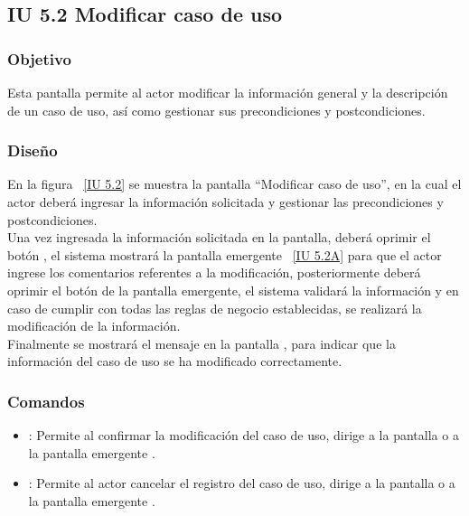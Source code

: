 \newpage 
\subsection{IU 5.2 Modificar caso de uso}

\subsubsection{Objetivo}
	
	Esta pantalla permite al actor modificar la información general y la descripción de un caso de uso, así como gestionar sus precondiciones y postcondiciones.

\subsubsection{Diseño}

    En la figura ~\ref{IU 5.2} se muestra la pantalla ``Modificar caso de uso'', en la cual el actor deberá ingresar la información solicitada y gestionar las precondiciones y postcondiciones.\\
    
    Una vez ingresada la información solicitada en la pantalla, deberá oprimir el botón , el sistema mostrará la pantalla emergente ~\ref{IU 5.2A} para que el actor ingrese los comentarios referentes a la modificación, posteriormente deberá oprimir el botón  de la pantalla emergente, el sistema validará la información y en caso de cumplir con todas las reglas de negocio establecidas, se realizará la modificación de la información.\\
	    
    Finalmente se mostrará el mensaje  en la pantalla , para indicar que la información del caso de uso se ha modificado correctamente.        




\subsubsection{Comandos}
\begin{itemize}
	\item {}: Permite al confirmar la modificación del caso de uso, dirige a la pantalla  o a la pantalla emergente .
	\item {}: Permite al actor cancelar el registro del caso de uso, dirige a la pantalla  o a la pantalla emergente .
\end{itemize}

